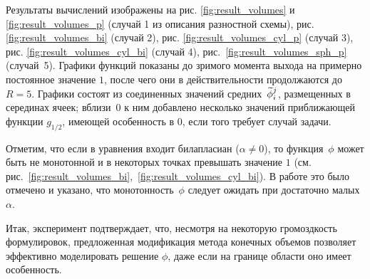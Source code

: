 Результаты вычислений изображены на рис. \ref{fig:result_volumes} и \ref{fig:result_volumes_p} (случай 1 из описания разностной схемы), рис. \ref{fig:result_volumes_bi} (случай 2), рис. \ref{fig:result_volumes_cyl_p} (случай 3), рис. \ref{fig:result_volumes_cyl_bi} (случай 4), рис.~\ref{fig:result_volumes_sph_p} (случай~5). Графики функций показаны до зримого момента выхода на примерно постоянное значение $1$, после чего они в действительности продолжаются до $R = 5$. Графики состоят из соединенных значений средних~${\widetilde{\phi}}_i^j$, размещенных в серединах ячеек; вблизи~$0$ к ним добавлено несколько значений приближающей функции $g_{1/2}$, имеющей особенность в $0$, если того требует случай задачи.

Отметим, что если в уравнения входит билапласиан ($\alpha \neq 0$), то функция~$\phi$ может быть не монотонной и в некоторых точках превышать значение $1$ (см. рис.~\ref{fig:result_volumes_bi},~\ref{fig:result_volumes_cyl_bi}). В работе \cite{zipunova_higher_codimension} это было отмечено и указано, что монотонность~$\phi$ следует ожидать при достаточно малых $\alpha$.

Итак, эксперимент подтверждает, что, несмотря на некоторую громоздкость формулировок, предложенная модификация метода конечных объемов позволяет эффективно моделировать решение $\phi$, даже если на границе области оно имеет особенность.